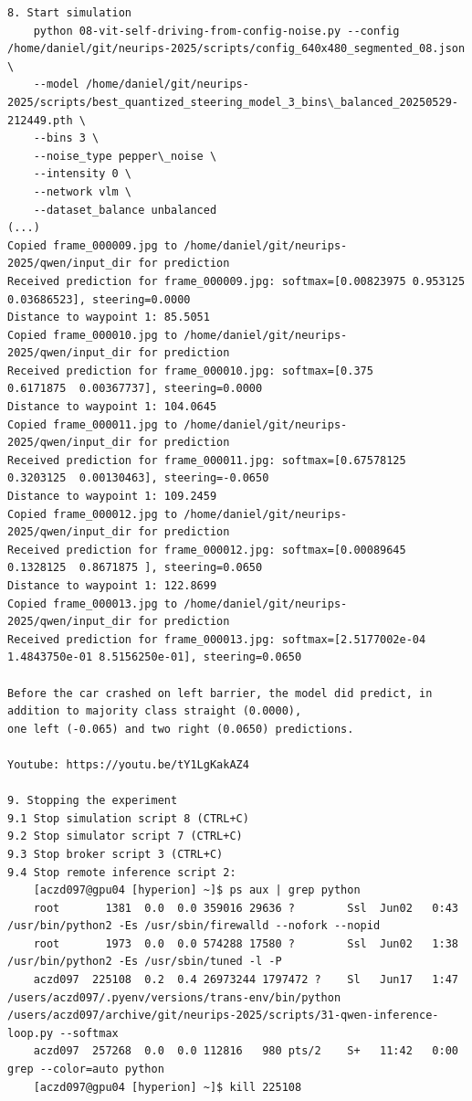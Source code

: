 \begin{verbatim}
8. Start simulation
    python 08-vit-self-driving-from-config-noise.py --config /home/daniel/git/neurips-2025/scripts/config_640x480_segmented_08.json \
    --model /home/daniel/git/neurips-2025/scripts/best_quantized_steering_model_3_bins\_balanced_20250529-212449.pth \
    --bins 3 \
    --noise_type pepper\_noise \
    --intensity 0 \
    --network vlm \
    --dataset_balance unbalanced
(...)
Copied frame_000009.jpg to /home/daniel/git/neurips-2025/qwen/input_dir for prediction
Received prediction for frame_000009.jpg: softmax=[0.00823975 0.953125   0.03686523], steering=0.0000
Distance to waypoint 1: 85.5051
Copied frame_000010.jpg to /home/daniel/git/neurips-2025/qwen/input_dir for prediction
Received prediction for frame_000010.jpg: softmax=[0.375      0.6171875  0.00367737], steering=0.0000
Distance to waypoint 1: 104.0645
Copied frame_000011.jpg to /home/daniel/git/neurips-2025/qwen/input_dir for prediction
Received prediction for frame_000011.jpg: softmax=[0.67578125 0.3203125  0.00130463], steering=-0.0650
Distance to waypoint 1: 109.2459
Copied frame_000012.jpg to /home/daniel/git/neurips-2025/qwen/input_dir for prediction
Received prediction for frame_000012.jpg: softmax=[0.00089645 0.1328125  0.8671875 ], steering=0.0650
Distance to waypoint 1: 122.8699
Copied frame_000013.jpg to /home/daniel/git/neurips-2025/qwen/input_dir for prediction
Received prediction for frame_000013.jpg: softmax=[2.5177002e-04 1.4843750e-01 8.5156250e-01], steering=0.0650

Before the car crashed on left barrier, the model did predict, in addition to majority class straight (0.0000),
one left (-0.065) and two right (0.0650) predictions.

Youtube: https://youtu.be/tY1LgKakAZ4

9. Stopping the experiment
9.1 Stop simulation script 8 (CTRL+C)
9.2 Stop simulator script 7 (CTRL+C)
9.3 Stop broker script 3 (CTRL+C)
9.4 Stop remote inference script 2:
    [aczd097@gpu04 [hyperion] ~]$ ps aux | grep python
    root       1381  0.0  0.0 359016 29636 ?        Ssl  Jun02   0:43 /usr/bin/python2 -Es /usr/sbin/firewalld --nofork --nopid
    root       1973  0.0  0.0 574288 17580 ?        Ssl  Jun02   1:38 /usr/bin/python2 -Es /usr/sbin/tuned -l -P
    aczd097  225108  0.2  0.4 26973244 1797472 ?    Sl   Jun17   1:47 /users/aczd097/.pyenv/versions/trans-env/bin/python /users/aczd097/archive/git/neurips-2025/scripts/31-qwen-inference-loop.py --softmax
    aczd097  257268  0.0  0.0 112816   980 pts/2    S+   11:42   0:00 grep --color=auto python
    [aczd097@gpu04 [hyperion] ~]$ kill 225108



\end{verbatim}
